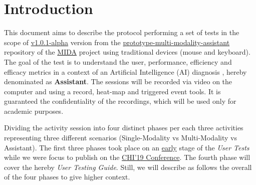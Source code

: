 
\section{Introduction}
\label{sec:sec001}

This document aims to describe the protocol performing a set of tests in the scope of \hyperlink{https://github.com/mida-project/prototype-multi-modality-assistant/releases/tag/v1.0.1-alpha}{v1.0.1-alpha} version from the \hyperlink{https://github.com/mida-project/prototype-multi-modality-assistant}{prototype-multi-modality-assistant} repository of the \hyperlink{https://mida-project.github.io/}{MIDA} project using traditional devices (mouse and keyboard). The goal of the test is to understand the user, performance, efficiency and efficacy metrics in a context of an Artificial Intelligence (AI) diagnosis \cite{fan2018investigating}, hereby denominated as \textbf{Assistant}. The sessions will be recorded via video on the computer and using a record, heat-map and triggered event tools. It is guaranteed the confidentiality of the recordings, which will be used only for academic purposes.

Dividing the activity session into four distinct phases per each three activities representing three different scenarios (Single-Modality vs Multi-Modality vs Assistant). The first three phases took place on an \hyperlink{https://github.com/MIMBCD-UI/testing-guide-breast/tree/master/samples/test_4}{early} stage of the \textit{User Tests} while we were focus to publish on the \hyperlink{https://chi2019.acm.org/}{CHI'19 Conference}. The fourth phase will cover the hereby \textit{User Testing Guide}. Still, we will describe as follows the overall of the four phases to give higher context.

